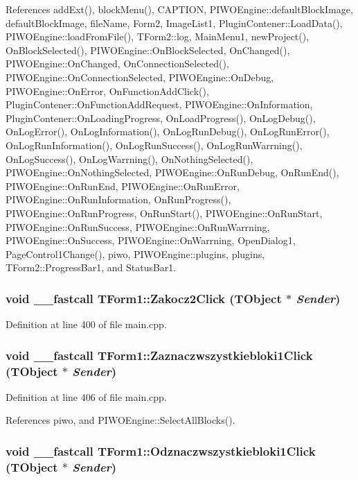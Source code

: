 References addExt(), blockMenu(), CAPTION, PIWOEngine::defaultBlockImage, defaultBlockImage, fileName, Form2, ImageList1, PluginContener::LoadData(), PIWOEngine::loadFromFile(), TForm2::log, MainMenu1, newProject(), OnBlockSelected(), PIWOEngine::OnBlockSelected, OnChanged(), PIWOEngine::OnChanged, OnConnectionSelected(), PIWOEngine::OnConnectionSelected, PIWOEngine::OnDebug, PIWOEngine::OnError, OnFunctionAddClick(), PluginContener::OnFunctionAddRequest, PIWOEngine::OnInformation, PluginContener::OnLoadingProgress, OnLoadProgress(), OnLogDebug(), OnLogError(), OnLogInformation(), OnLogRunDebug(), OnLogRunError(), OnLogRunInformation(), OnLogRunSuccess(), OnLogRunWarrning(), OnLogSuccess(), OnLogWarrning(), OnNothingSelected(), PIWOEngine::OnNothingSelected, PIWOEngine::OnRunDebug, OnRunEnd(), PIWOEngine::OnRunEnd, PIWOEngine::OnRunError, PIWOEngine::OnRunInformation, OnRunProgress(), PIWOEngine::OnRunProgress, OnRunStart(), PIWOEngine::OnRunStart, PIWOEngine::OnRunSuccess, PIWOEngine::OnRunWarrning, PIWOEngine::OnSuccess, PIWOEngine::OnWarrning, OpenDialog1, PageControl1Change(), piwo, PIWOEngine::plugins, plugins, TForm2::ProgressBar1, and StatusBar1.\hypertarget{classTForm1_21263e28fe98f4d7da87b0f9fb411906}{
\subsubsection[Zakocz2Click]{\setlength{\rightskip}{0pt plus 5cm}void \_\-\_\-fastcall TForm1::Zakocz2Click (TObject $\ast$ {\em Sender})}}
\label{classTForm1_21263e28fe98f4d7da87b0f9fb411906}




Definition at line 400 of file main.cpp.\hypertarget{classTForm1_1ea3b1aff58b60bd5338bceb94416ea4}{
\subsubsection[Zaznaczwszystkiebloki1Click]{\setlength{\rightskip}{0pt plus 5cm}void \_\-\_\-fastcall TForm1::Zaznaczwszystkiebloki1Click (TObject $\ast$ {\em Sender})}}
\label{classTForm1_1ea3b1aff58b60bd5338bceb94416ea4}




Definition at line 406 of file main.cpp.

References piwo, and PIWOEngine::SelectAllBlocks().\hypertarget{classTForm1_8ddf63f3c72f524fb3e70559d2add67e}{
\subsubsection[Odznaczwszystkiebloki1Click]{\setlength{\rightskip}{0pt plus 5cm}void \_\-\_\-fastcall TForm1::Odznaczwszystkiebloki1Click (TObject $\ast$ {\em Sender})}}
\label{classTForm1_8ddf63f3c72f524fb3e70559d2add67e}





